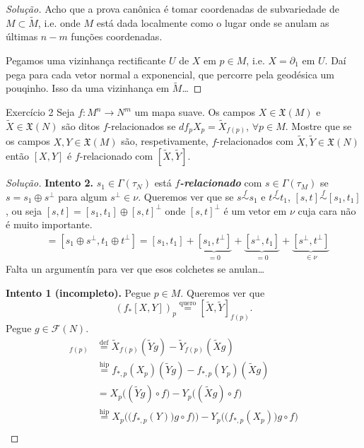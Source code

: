 \begin{proof}[Solução]\leavevmode
Acho que a prova canônica é tomar coordenadas de subvariedade de \(M \subset \tilde{M}\), i.e. onde \(M\) está dada localmente como o lugar onde se anulam as últimas \(n-m\) funções coordenadas. 

Pegamos uma vizinhança rectificante \(U\) de \(X\) em \(p \in M\), i.e. \(X=\partial_1\) em \(U\). Daí pega para cada vetor normal a exponencial, que percorre pela geodésica um pouqinho. Isso da uma vizinhança em \(\tilde{M}\)…
\end{proof}

\begin{thing4}{Exercício 2}\label{exer:2}\leavevmode
	Seja \(f:M^n \to N^m\) um mapa suave. Os campos \(X \in \mathfrak{X}(M)\) e \(\tilde{X} \in \mathfrak{X}(N)\) são ditos \(f\)-relacionados se \(df_pX_p=\tilde{X}_{f(p)}\), \(\forall  p \in M\). Mostre que se os campos \(X,Y \in \mathfrak{X}(M)\) são, respetivamente, \(f\)-relacionados com \(\tilde{X},\tilde{Y} \in \mathfrak{X}(N)\) então \([X,Y]\) é \(f\)-relacionado com \([\tilde{X},\tilde{Y}]\).
\end{thing4}

\begin{proof}[Solução]\leavevmode
	\textbf{Intento 2.} \(s_1 \in \Gamma(\tau_N)\) está \textit{\textbf{\(f\)-relacionado}} com \(s \in \Gamma(\tau_M)\) se \(s=s_1\oplus s^\perp\) para algum \(s^\perp\in\nu\). Queremos ver que se \(s\overset{f}{\sim}s_1\) e \(t \overset{f}{\sim}t_1\), \([s,t]\overset{f}{\sim}[s_1,t_1]\), ou seja \([s,t]=[s_1,t_1]\oplus [s,t]^\perp\) onde \([s,t]^\perp\) é um vetor em \(\nu\) cuja cara não  é muito importante.
	\begin{align*}
		[s,t]&=[s_1\oplus s^\perp,t_1\oplus t^\perp]=[s_1,t_1]+\underbrace{[s_1,t^\perp]}_{=0}+\underbrace{[s^\perp,t_1]}_{=0}+\underbrace{[s^\perp,t^\perp]}_{\in \nu}
	\end{align*}
{\color{4}Falta un argumentín para ver que esos colchetes se anulan…}

\textbf{Intento 1 (incompleto).} Pegue \(p \in M\). Queremos ver que
\[(f_{*}[X,Y])_p\overset{\text{quero}}{=}[\tilde{X},\tilde{Y}]_{f(p)}.\]
Pegue \(g \in \mathcal{F}(N)\).
\begin{align*}
	[\tilde{X},\tilde{Y}]_{f(p)}&\overset{\operatorname{def}}{=}\tilde{X}_{f(p)}(\tilde{Y}g)-\tilde{Y}_{f(p)}(\tilde{X}g)\\
	&\overset{\operatorname{hip}}{=}f_{*,p}(X_p)(\tilde{Y}g)-f_{*,p}(Y_p)(\tilde{X}g)\\
	&=X_{p}\Big((\tilde{Y}g)\circ f\Big)-Y_p\Big((\tilde{X}g)\circ f\Big)\\
	&\overset{\operatorname{hip}}{=}X_p\Big(\big(f_{*,p}(Y)\big)g\circ f)\Big)-Y_p\Big(\big(f_{*,p}(X_p)\big)g \circ f\Big)\\
\end{align*}
\end{proof}

